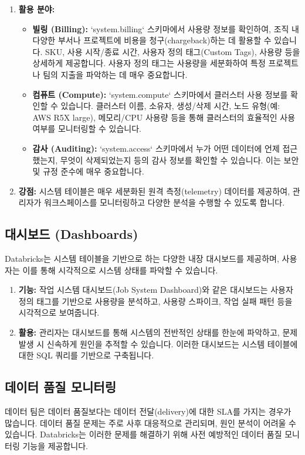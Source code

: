 \documentclass[11pt,a4paper]{article}
\begin{document}
\begin{enumerate}
    \item \textbf{활용 분야:}
    \begin{itemize}
        \item \textbf{빌링 (Billing):} `system.billing` 스키마에서 사용량 정보를 확인하여, 조직 내 다양한 부서나 프로젝트에 비용을 청구(chargeback)하는 데 활용할 수 있습니다. SKU, 사용 시작/종료 시간, 사용자 정의 태그(Custom Tags), 사용량 등을 상세하게 제공합니다. 사용자 정의 태그는 사용량을 세분화하여 특정 프로젝트나 팀의 지출을 파악하는 데 매우 중요합니다.
        \item \textbf{컴퓨트 (Compute):} `system.compute` 스키마에서 클러스터 사용 정보를 확인할 수 있습니다. 클러스터 이름, 소유자, 생성/삭제 시간, 노드 유형(예: AWS R5X large), 메모리/CPU 사용량 등을 통해 클러스터의 효율적인 사용 여부를 모니터링할 수 있습니다.
        \item \textbf{감사 (Auditing):} `system.access` 스키마에서 누가 어떤 데이터에 언제 접근했는지, 무엇이 삭제되었는지 등의 감사 정보를 확인할 수 있습니다. 이는 보안 및 규정 준수에 매우 중요합니다.
    \end{itemize}

    \item \textbf{강점:}
    시스템 테이블은 매우 세분화된 원격 측정(telemetry) 데이터를 제공하여, 관리자가 워크스페이스를 모니터링하고 다양한 분석을 수행할 수 있도록 합니다.
\end{enumerate}

\subsection{대시보드 (Dashboards)}
Databricks는 시스템 테이블을 기반으로 하는 다양한 내장 대시보드를 제공하며, 사용자는 이를 통해 시각적으로 시스템 상태를 파악할 수 있습니다.

\begin{enumerate}
    \item \textbf{기능:}
    작업 시스템 대시보드(Job System Dashboard)와 같은 대시보드는 사용자 정의 태그를 기반으로 사용량을 분석하고, 사용량 스파이크, 작업 실패 패턴 등을 시각적으로 보여줍니다.
    \item \textbf{활용:}
    관리자는 대시보드를 통해 시스템의 전반적인 상태를 한눈에 파악하고, 문제 발생 시 신속하게 원인을 추적할 수 있습니다. 이러한 대시보드는 시스템 테이블에 대한 SQL 쿼리를 기반으로 구축됩니다.
\end{enumerate}

\subsection{데이터 품질 모니터링}
데이터 팀은 데이터 품질보다는 데이터 전달(delivery)에 대한 SLA를 가지는 경우가 많습니다. 데이터 품질 문제는 주로 사후 대응적으로 관리되며, 원인 분석이 어려울 수 있습니다. Databricks는 이러한 문제를 해결하기 위해 사전 예방적인 데이터 품질 모니터링 기능을 제공합니다.
\end{document}
